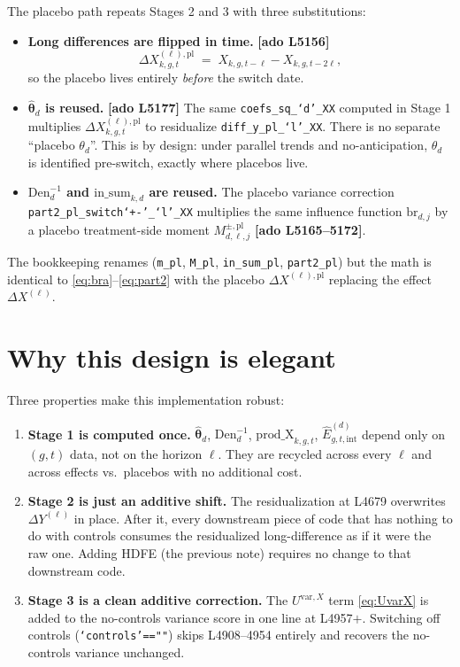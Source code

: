 \documentclass[11pt]{article}
\newcommand{\code}[1]{\texttt{\small #1}}
\newcommand{\Adoref}[1]{\textcolor{accent}{\footnotesize\textbf{[ado L#1]}}}
\newcommand{\1}{\mathbb{1}}
\newcommand{\thetad}{\widehat{\bm{\theta}}_d}
\begin{document}
The placebo path repeats Stages 2 and 3 with three substitutions:
\begin{itemize}[leftmargin=*, itemsep=2pt]
\item \textbf{Long differences are flipped in time.} \Adoref{5156}
      \[
      \Delta X^{(\ell),\mathrm{pl}}_{k,g,t} \;=\; X_{k,g,t-\ell} - X_{k,g,t-2\ell},
      \]
      so the placebo lives entirely \emph{before} the switch date.
\item \textbf{$\thetad$ is reused.} \Adoref{5177}
      The same \code{coefs\_sq\_`d'\_XX} computed in Stage 1 multiplies
      $\Delta X^{(\ell),\mathrm{pl}}_{k,g,t}$ to residualize
      \code{diff\_y\_pl\_`l'\_XX}. There is no separate ``placebo
      $\theta_d$''. This is by design: under parallel trends and
      no-anticipation, $\theta_d$ is identified pre-switch, exactly where
      placebos live.
\item \textbf{$\mathrm{Den}_d^{-1}$ and $\mathrm{in\_sum}_{k,d}$ are reused.}
      The placebo variance correction
      \code{part2\_pl\_switch`+\!-'\_`l'\_XX}
      multiplies the same influence function $\mathrm{br}_{d,j}$ by a placebo
      treatment-side moment $M^{\pm,\mathrm{pl}}_{d,\ell,j}$ \Adoref{5165--5172}.
\end{itemize}
The bookkeeping renames (\code{m\_pl}, \code{M\_pl}, \code{in\_sum\_pl},
\code{part2\_pl}) but the math is identical to \eqref{eq:bra}--\eqref{eq:part2}
with the placebo $\Delta X^{(\ell),\mathrm{pl}}$ replacing the effect
$\Delta X^{(\ell)}$.

\section[Why this design is elegant]{Why this design is elegant}

Three properties make this implementation robust:

\begin{enumerate}[leftmargin=*, itemsep=3pt]
\item \textbf{Stage 1 is computed once.} $\thetad$, $\mathrm{Den}_d^{-1}$,
      $\mathrm{prod\_X}_{k,g,t}$, $\widehat{E}^{(d)}_{g,t,\mathrm{int}}$
      depend only on $(g,t)$ data, not on the horizon $\ell$. They are
      recycled across every $\ell$ and across effects vs.\ placebos with no
      additional cost.
\item \textbf{Stage 2 is just an additive shift.} The residualization at
      L4679 overwrites $\Delta Y^{(\ell)}$ in place. After it, every
      downstream piece of code that has nothing to do with controls
      consumes the residualized long-difference as if it were the raw one.
      Adding HDFE (the previous note) requires no change to that
      downstream code.
\item \textbf{Stage 3 is a clean additive correction.} The
      $U^{\mathrm{var},X}$ term \eqref{eq:UvarX} is added to the no-controls
      variance score in one line at L4957$+$. Switching off controls
      (\code{`controls'==\!""}) skips L4908--4954 entirely and recovers the
      no-controls variance unchanged.
\end{enumerate}
\end{document}

